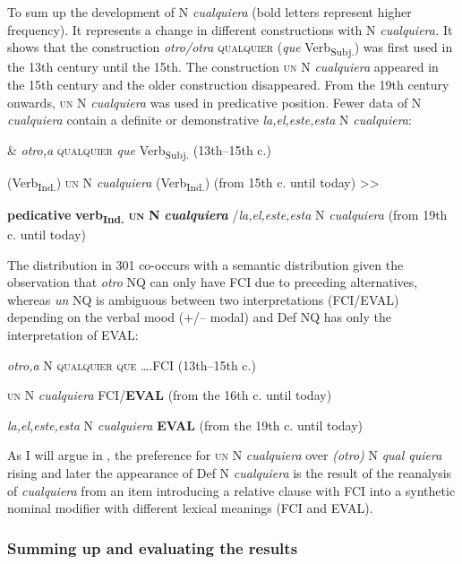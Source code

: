 \documentclass[output=paper]{langscibook}
\begin{document}
  To sum up the development of N \textit{cualquiera} (bold letters represent higher frequency). It represents a change in different constructions with N \textit{cualquiera.} It shows that the construction \textit{otro/otra} \textsc{qualquier} (\textit{que} Verb\textsubscript{Subj.}) was first used in the 13th century until the 15th. The construction \textsc{un} N \textit{cualquiera} appeared in the 15th century and the older construction disappeared. From the 19th century onwards, \textsc{un} N \textit{cualquiera} was used in predicative position. Fewer data of N \textit{cualquiera} contain a definite or demonstrative \textit{la,el,este,esta} N \textit{cualquiera}:

  \& \textit{otro,a} \textsc{qualquier} \textit{que} Verb\textsubscript{Subj.} (13th–15th c.) 

    (Verb\textsubscript{Ind.}) \textsc{un} N \textit{cualquiera} (Verb\textsubscript{Ind.}) (from 15th c. until today) >>

   \textbf{pedicative} \textbf{verb\textsubscript{Ind.}} \textbf{\textsc{un}} \textbf{N} \textbf{\textit{cualquiera}} /\textit{la,el,este,esta} N \textit{cualquiera} (from 19th c. until today)

The distribution in 301 co-occurs with a semantic distribution given the observation that \textit{otro} NQ can only have FCI due to preceding alternatives, whereas \textit{un} NQ is ambiguous between two interpretations (FCI/EVAL) depending on the verbal mood (+/– modal) and Def NQ has only the interpretation of EVAL:

  \textit{otro,a} N \textsc{qualquier} \textsc{que} ….FCI (13th–15th c.) 

      \textsc{un} N \textit{cualquiera} FCI/\textbf{EVAL} (from the 16th c. until today) 

   \textit{la,el,este,esta} N \textit{cualquiera} \textbf{EVAL} (from the 19th c. until today)

As I will argue in , the preference for \textsc{un} N \textit{cualquiera} over \textit{(otro)} N \textit{qual quiera} rising and later the appearance of Def N \textit{cualquiera} is the result of the reanalysis of \textit{cualquiera} from an item introducing a relative clause with FCI into a synthetic nominal modifier with different lexical meanings (FCI and EVAL). 

\subsubsection{Summing up and evaluating the results} 
\end{document}
